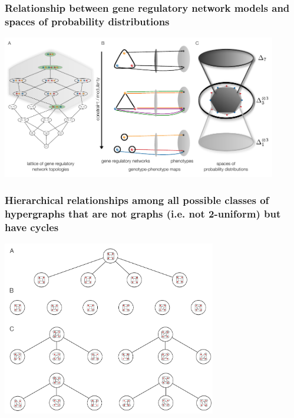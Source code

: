 \begin{frame}
\vspace{1em}
\frametitle{Relationship between gene regulatory network models and spaces of probability distributions}
\begin{center}
\includegraphics[width=0.9\textwidth]{fig/conediagram.pdf}\\
\end{center}
\end{frame}

\begin{frame}
\vspace{1em}
\frametitle{Hierarchical relationships among all possible classes of hypergraphs that are not graphs (i.e. not 2-uniform) but have cycles}
\begin{center}
\includegraphics[width=0.7\textwidth]{fig/non2uniformcyclichypergraphhasse.pdf}\\
\end{center}
\end{frame}

